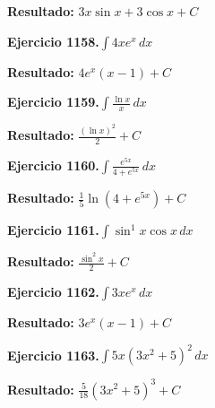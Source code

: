 \documentclass[10pt,a4paper]{article}
\begin{document}
\begin{solbox}
\textbf{Resultado:} \(\displaystyle 3x\sin x + 3\cos x + C\)
\end{solbox}

\begin{ejbox}
\textbf{Ejercicio 1158.}\quad $\int 4x e^{x}\,dx$
\end{ejbox}

\begin{solbox}
\textbf{Resultado:} \(\displaystyle 4e^x(x-1) + C\)
\end{solbox}

\newpage
\begin{ejbox}
\textbf{Ejercicio 1159.}\quad $\int \frac{\ln x}{x}\,dx$
\end{ejbox}

\begin{solbox}
\textbf{Resultado:} \(\displaystyle \frac{(\ln x)^2}{2} + C\)
\end{solbox}

\begin{ejbox}
\textbf{Ejercicio 1160.}\quad $\int \frac{e^{5x}}{4+e^{5x}}\,dx$
\end{ejbox}

\begin{solbox}
\textbf{Resultado:} \(\displaystyle \frac{1}{5}\ln(4+e^{5x}) + C\)
\end{solbox}

\begin{ejbox}
\textbf{Ejercicio 1161.}\quad $\int \sin^{1}x \cos x\,dx$
\end{ejbox}

\begin{solbox}
\textbf{Resultado:} \(\displaystyle \frac{\sin^{2}x}{2} + C\)
\end{solbox}

\newpage
\begin{ejbox}
\textbf{Ejercicio 1162.}\quad $\int 3x e^{x}\,dx$
\end{ejbox}

\begin{solbox}
\textbf{Resultado:} \(\displaystyle 3e^x(x-1) + C\)
\end{solbox}

\begin{ejbox}
\textbf{Ejercicio 1163.}\quad $\int 5x(3x^2 + 5)^{2}\,dx$
\end{ejbox}

\begin{solbox}
\textbf{Resultado:} \(\displaystyle \frac{5}{18}(3x^2+5)^{3} + C\)
\end{solbox}
\end{document}
